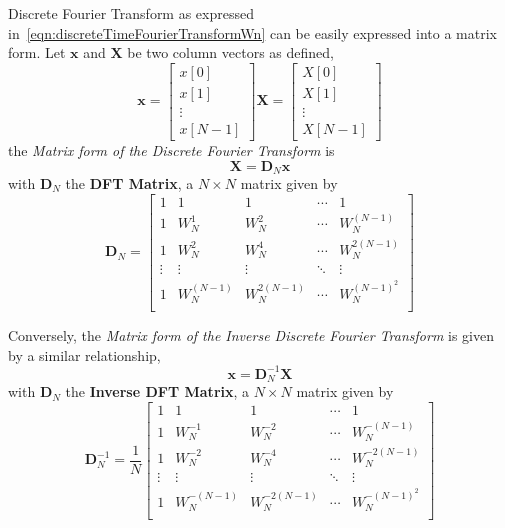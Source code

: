 \documentclass[\documentfontsize, twocolumn]{\classname}
\begin{document}
Discrete Fourier Transform as expressed in~\ref{eqn:discreteTimeFourierTransformWn} can be easily expressed into a matrix form. Let $\bm x$ and $\bm X$ be two column vectors as defined,
\[
    \bm{x} = \begin{bmatrix} x[0] \\ x[1] \\ \vdots \\ x[N-1] \end{bmatrix}
    \bm{X} = \begin{bmatrix} X[0] \\ X[1] \\ \vdots \\ X[N-1] \end{bmatrix}
\]
the \emph{Matrix form of the Discrete Fourier Transform} is
\begin{equation}\label{eqn:dftMatrixForm}
    \bm{X} = \bm{D}_N\bm{x}
\end{equation}
with $\bm D_N$ the \textbf{DFT Matrix}, a $N \times N$ matrix given by
\begin{equation}\label{eqn:dftMatrixDn}
    \bm D_N = \begin{bmatrix}
        1 & 1 & 1 & \cdots & 1 \\
        1 & W_N^1 & W_N^2 & \cdots & W_N^{(N-1)} \\
        1 & W_N^2 & W_N^4 & \cdots & W_N^{2(N-1)} \\
        \vdots & \vdots & \vdots & \ddots & \vdots \\
        1 & W_N^{(N-1)} & W_N^{2(N-1)} & \cdots & W_N^{(N-1)^2} \\
    \end{bmatrix}
\end{equation}

Conversely, the \emph{Matrix form of the Inverse Discrete Fourier Transform} is given by a similar relationship,
\begin{equation}\label{eqn:idftMatrixForm}
    \bm{x} = \bm{D}^{-1}_N\bm{X}
\end{equation}
with $\bm D_N$ the \textbf{Inverse DFT Matrix}, a $N \times N$ matrix given by
\begin{equation}\label{eqn:idftMatrixDn}
    \bm D^{-1}_N = \frac 1 N\begin{bmatrix}
        1 & 1 & 1 & \cdots & 1 \\
        1 & W_N^{-1} & W_N^{-2} & \cdots & W_N^{-(N-1)} \\
        1 & W_N^{-2} & W_N^{-4} & \cdots & W_N^{-2(N-1)} \\
        \vdots & \vdots & \vdots & \ddots & \vdots \\
        1 & W_N^{-(N-1)} & W_N^{-2(N-1)} & \cdots & W_N^{-(N-1)^2} \\
    \end{bmatrix}
\end{equation}
\end{document}
